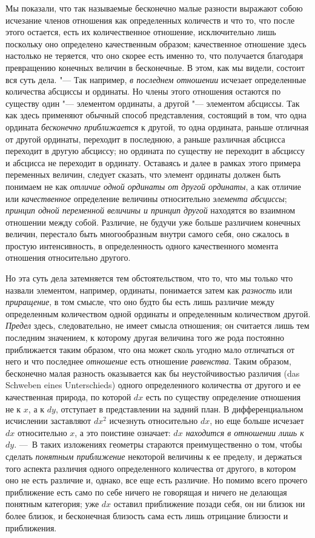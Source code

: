 Мы показали, что так называемые бесконечно малые разности выражают собою
исчезание членов отношения как определенных количеств и что то, что после
этого остается, есть их количественное отношение, исключительно лишь
поскольку оно определено качественным образом; качественное отношение здесь
настолько не теряется, что оно скорее есть именно то, что получается
благодаря превращению конечных величин в бесконечные. В этом, как мы
видели, состоит вся суть дела. "--- Так например, {\em в
последнем отношении} исчезает определенные количества абсциссы и ординаты.
Но члены этого отношения остаются по существу один "--- элементом ординаты,
а другой "--- элементом абсциссы. Так как здесь применяют обычный способ
представления, состоящий в том, что одна ордината
{\em бесконечно приближается} к другой, то одна
ордината, раньше отличная от другой ординаты, переходит в последнюю, а
раньше различная абсцисса переходит в другую абсциссу; но ордината по
существу не переходит в абсциссу и абсцисса не переходит в ординату.
Оставаясь и далее в рамках этого примера переменных величин, следует
сказать, что элемент ординаты должен быть понимаем не как
{\em отличие одной ординаты от другой ординаты}, а как
отличие или {\em качественное} определение величины
относительно {\em элемента абсциссы};
{\em принцип одной переменной величины и принцип
другой} находятся во взаимном отношении между собой. Различие, не будучи
уже больше различием конечных величин, перестало быть многообразным внутри
самого себя, оно сжалось в простую интенсивность, в определенность одного
качественного момента отношения относительно другого.

Но эта суть дела затемняется тем обстоятельством, что то, что мы только что
назвали элементом, например, ординаты, понимается затем как
{\em разность} или
{\em приращение}, в том смысле, что оно будто бы есть
лишь различие между определенным количеством одной ординаты и определенным
количеством другой. {\em Предел} здесь, следовательно,
не имеет смысла отношения; он считается лишь тем последним значением, к
которому другая величина того же рода постоянно приближается таким образом,
что она может сколь угодно мало отличаться от него и что последнее
{\em отношение} есть отношение
{\em равенства}. Таким образом, бесконечно малая
разность оказывается как бы неустойчивостью различия (das Schweben eines
Unterschieds) одного определенного количества от другого и ее качественная
природа, по которой $dx$ есть по существу
определение отношения не к $x$, а к
$dy$, отступает в представлении на задний план. В
дифференциальном исчислении заставляют
$dx^2$ исчезнуть относительно
$dx$, но еще больше исчезает $dx$ относительно $x$, а
это поистине означает: {\em $dx$ находится в отношении
лишь к $dy$}. ---~В таких изложениях геометры стараются преимущественно
о том, чтобы сделать {\em понятным приближение} некоторой
величины к ее пределу, и держаться того аспекта различия одного
определенного количества от другого, в котором оно не есть различие и,
однако, все еще есть различие. Но помимо всего прочего приближение есть
само по себе ничего не говорящая и ничего не делающая понятным категория;
уже $dx$ оставил приближение позади себя, он ни
близок ни более близок, и бесконечная близость сама есть лишь отрицание
близости и приближения.

